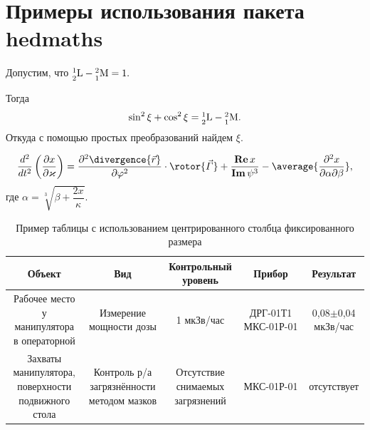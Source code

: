 \documentclass{hedwork}
\begin{document}
\section{Примеры использования пакета hedmaths}
    
\begin{solution}
    Допустим, что \( \nucleus{1}{2}{L} - \nucleus{2}{1}{M} = 1. \)

    Тогда
    \[
        \sin^2\xi + \cos^2\xi = 
        \nucleus{1}{2}{L} - \nucleus{2}{1}{M}.
    \]
    Откуда с помощью простых преобразований найдем \( \xi \).
\end{solution}

\[
    \dder{}{t}\left( \pder{x}{\kappa} \right) =
    \ppder{\divergence{\vec{r}}}{\phi}\cdot\rotor{\vec\Gamma} +
    \frac{\Re{x}}{\Im{\psi^3}} - \average{\pcder{x}{\alpha}{\beta}},
\]
где \( \alpha = \sqrt[3]{\beta + \dfrac{2x}{\kappa}} \).

\begin{table}[ht]
    \centering
    \caption{Пример таблицы с использованием центрированного столбца
        фиксированного размера}
    \begin{tabular}{|C{.2}|C{.2}|C{.17}|C{.18}|C{.15}|}
        \hline
        Объект & Вид & Контрольный уровень & Прибор & Результат \\ \hline
        Рабочее место у манипулятора в операторной
        & Измерение мощности дозы
        & 1 мкЗв/час & ДРГ-01Т1 МКС-01Р-01
        & 0,08\( \pm \)0,04 мкЗв/час \\ \hline
        Захваты манипулятора, поверхности подвижного стола
        & Контроль р/а загрязнённости методом мазков
        & Отсутствие снимаемых загрязнений
        & МКС-01Р-01 & отсутствует \\ \hline
    \end{tabular}
\end{table}

\listoffigures
\end{document}
